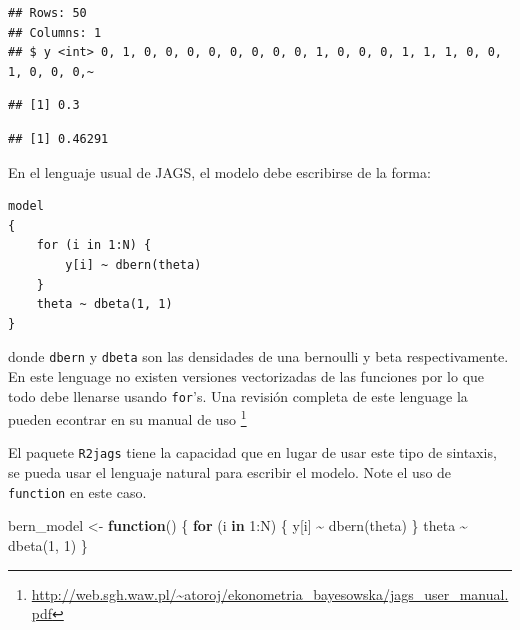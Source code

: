 \documentclass[
  12pt,
]{book}
\newenvironment{Shaded}{\begin{snugshade}}{\end{snugshade}}
\newcommand{\ControlFlowTok}[1]{\textcolor[rgb]{0.13,0.29,0.53}{\textbf{#1}}}
\newcommand{\DecValTok}[1]{\textcolor[rgb]{0.00,0.00,0.81}{#1}}
\newcommand{\FunctionTok}[1]{\textcolor[rgb]{0.00,0.00,0.00}{#1}}
\newcommand{\NormalTok}[1]{#1}
\newcommand{\OtherTok}[1]{\textcolor[rgb]{0.56,0.35,0.01}{#1}}
\newcommand{\SpecialCharTok}[1]{\textcolor[rgb]{0.00,0.00,0.00}{#1}}
\theoremstyle{definition}
\theoremstyle{definition}
\theoremstyle{definition}
\theoremstyle{definition}
\theoremstyle{remark}
\begin{document}
\begin{verbatim}
## Rows: 50
## Columns: 1
## $ y <int> 0, 1, 0, 0, 0, 0, 0, 0, 0, 0, 1, 0, 0, 0, 1, 1, 1, 0, 0, 1, 0, 0, 0,~
\end{verbatim}

\begin{Shaded}
\end{Shaded}

\begin{verbatim}
## [1] 0.3
\end{verbatim}

\begin{Shaded}
\end{Shaded}

\begin{verbatim}
## [1] 0.46291
\end{verbatim}

En el lenguaje usual de JAGS, el modelo debe escribirse de la forma:

\begin{verbatim}
model
{
    for (i in 1:N) {
        y[i] ~ dbern(theta)
    }
    theta ~ dbeta(1, 1)
}
\end{verbatim}

donde \texttt{dbern} y \texttt{dbeta} son las densidades de una bernoulli y beta respectivamente. En este lenguage no existen versiones vectorizadas de las funciones por lo que todo debe llenarse usando \texttt{for}'s. Una revisión completa de este lenguage la pueden econtrar en su manual de uso \footnote{\url{http://web.sgh.waw.pl/~atoroj/ekonometria_bayesowska/jags_user_manual.pdf}}

El paquete \texttt{R2jags} tiene la capacidad que en lugar de usar este tipo de sintaxis, se pueda usar el lenguaje natural para escribir el modelo. Note el uso de \texttt{function} en este caso.

\begin{Shaded}
\begin{Highlighting}[]
\NormalTok{bern\_model }\OtherTok{\textless{}{-}} \ControlFlowTok{function}\NormalTok{() \{}
    \ControlFlowTok{for}\NormalTok{ (i }\ControlFlowTok{in} \DecValTok{1}\SpecialCharTok{:}\NormalTok{N) \{}
\NormalTok{        y[i] }\SpecialCharTok{\textasciitilde{}} \FunctionTok{dbern}\NormalTok{(theta)}
\NormalTok{    \}}
\NormalTok{    theta }\SpecialCharTok{\textasciitilde{}} \FunctionTok{dbeta}\NormalTok{(}\DecValTok{1}\NormalTok{, }\DecValTok{1}\NormalTok{)}
\NormalTok{\}}
\end{Highlighting}
\end{Shaded}
\end{document}
